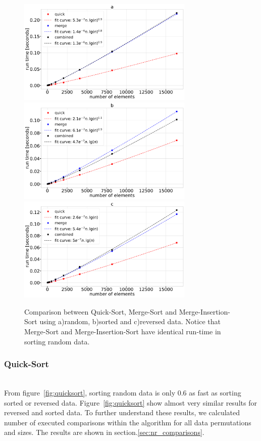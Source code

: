 \documentclass[sigconf, nonacm, natbib, screen, balance=False]{acmart}
\begin{document}
\begin{figure}
  \centering
  \includegraphics[width=84mm]{../figures/sub_sorts_random.pdf}
  \includegraphics[width=84mm]{../figures/sub_sorts_sorted.pdf}
  \includegraphics[width=84mm]{../figures/sub_sorts_reverse.pdf}
  \caption{Comparison between Quick-Sort, Merge-Sort and Merge-Insertion-Sort using a)random, b)sorted and c)reversed data. Notice that Merge-Sort and Merge-Insertion-Sort have identical run-time in sorting random data.}
  \label{fig:sub_comb}
\end{figure}


\subsubsection{Quick-Sort}\label{sec:quick}
\hfill\\
From figure~\ref{fig:quicksort}, sorting random data is only $0.6$ as fast as sorting sorted or reversed data. Figure~\ref{fig:quicksort} show almost very similar results for reversed and sorted data. To further understand these results, we calculated number of executed comparisons within the algorithm for all data permutations and sizes. The results are shown in section.\ref{sec:nr_comparisons}.  
\end{document}
